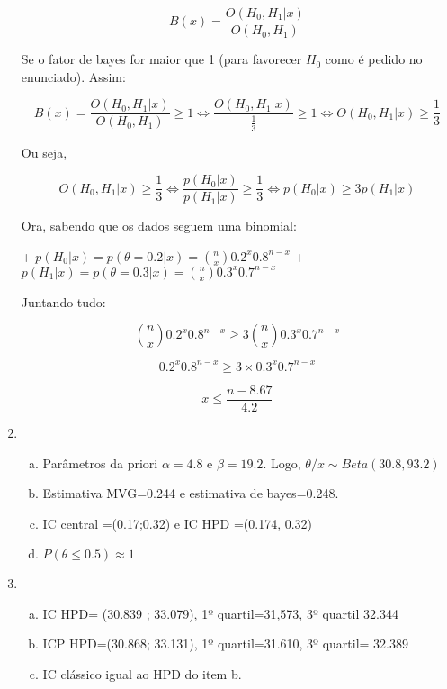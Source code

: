 \documentclass[10pt,brazil,addpoints]{exam}
\begin{document}
\begin{enumerate}[1.]
$$B(x) = \frac{O(H_0,H_1|x)}{O(H_0,H_1)}$$

Se o fator de bayes for maior que 1 (para favorecer $H_0$ como é pedido no enunciado). Assim:

$$B(x) = \frac{O(H_0,H_1|x)}{O(H_0,H_1)} \geq 1 \iff \frac{O(H_0,H_1|x)}{\frac{1}{3}} \geq 1 \iff O(H_0,H_1|x) \geq \frac{1}{3}$$

Ou seja,

$$O(H_0,H_1|x) \geq \frac{1}{3} \iff \frac{p(H_0|x)}{p(H_1|x)} \geq \frac{1}{3}\iff p(H_0|x) \geq 3p(H_1|x)$$

Ora, sabendo que os dados seguem uma binomial:

+ $p(H_0|x) = p(\theta = 0.2|x) = \binom n x 0.2^x 0.8^{n-x}$
+ $p(H_1|x) = p(\theta = 0.3|x) = \binom n x 0.3^x 0.7^{n-x}$

Juntando tudo:

$$\binom n x 0.2^x 0.8^{n-x} \geq 3 \binom n x 0.3^x 0.7^{n-x}$$

$$0.2^x 0.8^{n-x} \geq 3 \times 0.3^x 0.7^{n-x}$$

$$x \leq \frac{n - 8.67}{4.2}$$



\item 

\begin{enumerate}[a)]
\item Parâmetros da priori $\alpha=4.8$ e 
$\beta=19.2 $. Logo, $\theta/x\sim Beta(30.8, 93.2)$

\item Estimativa MVG=0.244 e estimativa de bayes=0.248.

\item IC central =(0.17;0.32) e IC HPD =(0.174, 0.32)

\item $P(\theta \leq 0.5) \approx 1$
\end{enumerate}

\item 
\begin{enumerate}[a)]

\item IC HPD= (30.839 ; 33.079), 1º quartil=31,573, 3º quartil 32.344

\item ICP HPD=(30.868; 33.131), 1º quartil=31.610, 3º quartil= 32.389

\item IC clássico igual ao HPD do item b.




\end{enumerate}
\end{enumerate}
\end{document}
